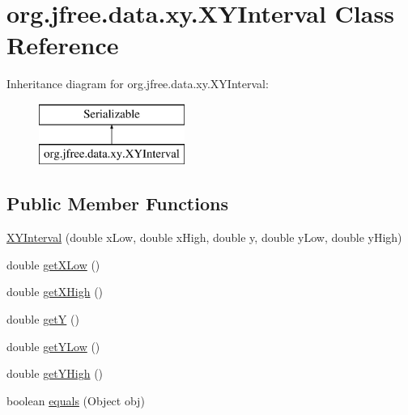 \hypertarget{classorg_1_1jfree_1_1data_1_1xy_1_1_x_y_interval}{}\section{org.\+jfree.\+data.\+xy.\+X\+Y\+Interval Class Reference}
\label{classorg_1_1jfree_1_1data_1_1xy_1_1_x_y_interval}
Inheritance diagram for org.\+jfree.\+data.\+xy.\+X\+Y\+Interval\+:\begin{figure}[H]
\begin{center}
\leavevmode
\includegraphics[height=2.000000cm]{classorg_1_1jfree_1_1data_1_1xy_1_1_x_y_interval}
\end{center}
\end{figure}
\subsection*{Public Member Functions}
\begin{DoxyCompactItemize}
\item 
\mbox{\hyperlink{classorg_1_1jfree_1_1data_1_1xy_1_1_x_y_interval_ae9059188480033b2b9814bf81468662f}{X\+Y\+Interval}} (double x\+Low, double x\+High, double y, double y\+Low, double y\+High)
\item 
double \mbox{\hyperlink{classorg_1_1jfree_1_1data_1_1xy_1_1_x_y_interval_a514f049945649e10dd4f853bd5cf6711}{get\+X\+Low}} ()
\item 
double \mbox{\hyperlink{classorg_1_1jfree_1_1data_1_1xy_1_1_x_y_interval_a0e09662e6aefb896e76eda0e29cad13b}{get\+X\+High}} ()
\item 
double \mbox{\hyperlink{classorg_1_1jfree_1_1data_1_1xy_1_1_x_y_interval_a22cfe61fd627f7ad44460d9e14a0f525}{getY}} ()
\item 
double \mbox{\hyperlink{classorg_1_1jfree_1_1data_1_1xy_1_1_x_y_interval_a1df5839a2c46e50b9a2d81c83861812d}{get\+Y\+Low}} ()
\item 
double \mbox{\hyperlink{classorg_1_1jfree_1_1data_1_1xy_1_1_x_y_interval_a297c3ee7854503153aeda6cb9e4d9483}{get\+Y\+High}} ()
\item 
boolean \mbox{\hyperlink{classorg_1_1jfree_1_1data_1_1xy_1_1_x_y_interval_a45ec9decb77607b63c6ae39dca4281e6}{equals}} (Object obj)
\end{DoxyCompactItemize}


